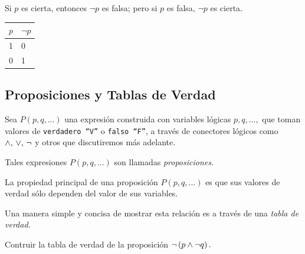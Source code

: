 \begin{definicion}[Negación]
 Si $p$ es cierta, entonces $\neg p$ es falsa; pero si $p$ es falsa, $\neg p$ es cierta.

\end{definicion}

 	\begin{tdv}[Negación] \hfill
 		\label{tdv:not}
 		\begin{center}
 			\begin{tabular}{|l|l|}\hline
 				$p$ & $\neg p$\\\hline
 				1 & 0 \\\hline
 				0 & 1 \\\hline
 			\end{tabular}
 		\end{center}

 	\end{tdv}

\subsection{Proposiciones y Tablas de Verdad}

 Sea $P(p,q,...)$ una expresión construida con variables lógicas $p,q,...,$ que toman valores de \texttt{verdadero ``V''} o \texttt{falso ``F''}, a través de conectores lógicos como $\wedge, \, \vee, \, \neg$ y otros  que discutiremos más adelante.

 Tales expresiones $P(p,q,...)$ son llamadas \emph{proposiciones.}

 La propiedad principal de una proposición $P(p,q,...)$ es que sus valores de verdad sólo dependen del valor de sus variables.

 Una manera simple y concisa de mostrar esta relación es a través de una \emph{tabla de verdad.}

 \begin{resuelto}
  Contruir la tabla de verdad de la proposición
  $\neg \left( p \wedge \neg q \right).$

 \end{resuelto}


